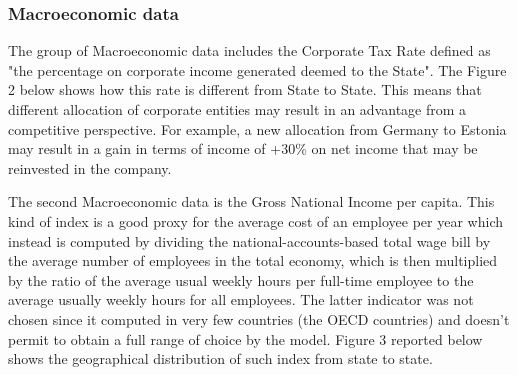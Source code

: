 \documentclass{article}
\begin{document}
\subsubsection{Macroeconomic data}
The group of Macroeconomic data includes the Corporate Tax Rate defined as "the percentage on corporate income generated deemed to the State". The Figure 2 below shows how this rate is different from State to State. This means that different allocation of corporate entities may result in an advantage from a competitive perspective. For example, a new allocation from Germany to Estonia may result in a gain in terms of income of +30\% on net income that may be reinvested in the company.

The second Macroeconomic data is the Gross National Income per capita. This kind of index is a good proxy for the average cost of an employee per year which instead is computed by dividing the national-accounts-based total wage bill by the average number of employees in the total economy, which is then multiplied by the ratio of the average usual weekly hours per full-time employee to the average usually weekly hours for all employees. The latter indicator was not chosen since it computed in very few countries (the OECD countries) and doesn't permit to obtain a full range of choice by the model. Figure 3 reported below shows the geographical distribution of such index from state to state.
\end{document}

